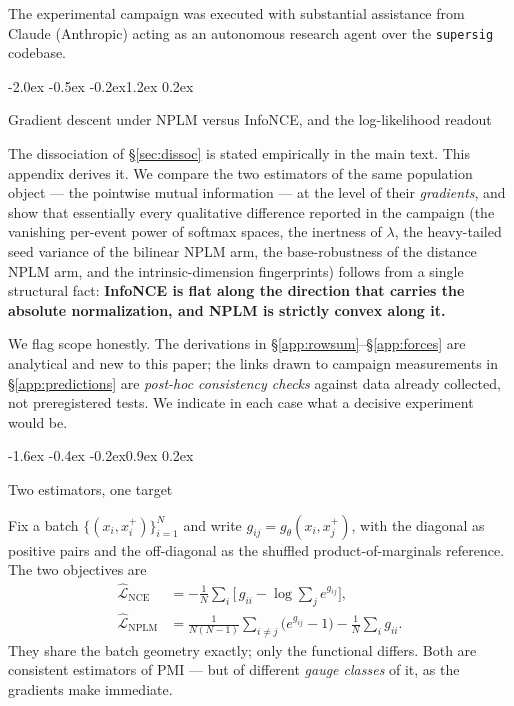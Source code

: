 \documentclass{article}
\makeatletter
\renewcommand\section{\@startsection{section}{1}{\z@}%
  {-2.0ex \@plus -0.5ex \@minus -0.2ex}{1.2ex \@plus 0.2ex}%
  {\large\bf\raggedright}}
\renewcommand\subsection{\@startsection{subsection}{2}{\z@}%
  {-1.6ex \@plus -0.4ex \@minus -0.2ex}{0.9ex \@plus 0.2ex}%
  {\normalsize\bf\raggedright}}
\makeatother
\begin{document}
The experimental campaign was executed with substantial assistance from Claude
(Anthropic) acting as an autonomous research agent over the
\texttt{supersig} codebase.

\appendix

\section{Gradient descent under NPLM versus InfoNCE, and the log-likelihood
readout}
\label{app:grad}

The dissociation of \S\ref{sec:dissoc} is stated empirically in the main text.
This appendix derives it. We compare the two estimators of the same population
object --- the pointwise mutual information --- at the level of their
\emph{gradients}, and show that essentially every qualitative difference
reported in the campaign (the vanishing per-event power of softmax spaces, the
inertness of $\lambda$, the heavy-tailed seed variance of the bilinear NPLM
arm, the base-robustness of the distance NPLM arm, and the intrinsic-dimension
fingerprints) follows from a single structural fact: \textbf{InfoNCE is flat
along the direction that carries the absolute normalization, and NPLM is
strictly convex along it.}

We flag scope honestly. The derivations in
\S\ref{app:rowsum}--\S\ref{app:forces} are analytical and new to this paper;
the links drawn to campaign measurements in \S\ref{app:predictions} are
\emph{post-hoc consistency checks} against data already collected, not
preregistered tests. We indicate in each case what a decisive experiment would
be.

\subsection{Two estimators, one target}

Fix a batch $\{(x_i,x_i^+)\}_{i=1}^N$ and write $g_{ij}=g_\theta(x_i,x_j^+)$,
with the diagonal as positive pairs and the off-diagonal as the shuffled
product-of-marginals reference. The two objectives are
\begin{align}
\widehat{\mathcal{L}}_{\mathrm{NCE}}
&= -\frac1N\sum_i \Big[\,g_{ii} - \log\!\sum_j e^{g_{ij}}\Big],
\label{eq:app-nce}\\
\widehat{\mathcal{L}}_{\mathrm{NPLM}}
&= \frac{1}{N(N-1)}\sum_{i\neq j}\big(e^{g_{ij}}-1\big)
- \frac1N\sum_i g_{ii}.
\label{eq:app-nplm}
\end{align}
They share the batch geometry exactly; only the functional differs. Both are
consistent estimators of $\mathrm{PMI}$ --- but of different \emph{gauge
classes} of it, as the gradients make immediate.
\end{document}
